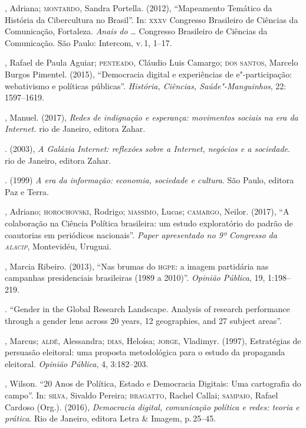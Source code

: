 {\begin{bibliohedra}
, Adriana; \textsc{montardo}, Sandra Portella. (2012), ``Mapeamento
Temático da História da Cibercultura no Brasil''. In: \textsc{xxxv} Congresso
Brasileiro de Ciências da Comunicação, Fortaleza. \textit{Anais do} \ldots{}
Congresso Brasileiro de Ciências da Comunicação. São Paulo: Intercom, v.\,1, 1--17.

, Rafael de Paula Aguiar; \textsc{penteado}, Cláudio Luis Camargo; \textsc{dos
santos}, Marcelo Burgos Pimentel. (2015), ``Democracia digital e
experiências de e"-participação: webativismo e políticas públicas''.
\textit{História, Ciências, Saúde"-Manguinhos}, 22: 1597--1619.

, Manuel. (2017), \textit{Redes de indignação e esperança:
movimentos sociais na era da Internet.} rio de Janeiro, editora Zahar.

\titidem. (2003), \textit{A Galáxia Internet: reflexões sobre a
Internet, negócios e a sociedade}. rio de Janeiro, editora Zahar.

\titidem. (1999) \textit{A era da informação: economia, sociedade
e cultura}. São Paulo, editora Paz e Terra.

, Adriano; \textsc{horochovski}, Rodrigo; \textsc{massimo}, Lucas; \textsc{camargo}, Neilor.
(2017), ``A colaboração na Ciência Política brasileira: um estudo
exploratório do padrão de coautorias em periódicos nacionais''.
\textit{Paper apresentado no 9º Congresso da \textsc{alacip}}, Montevidéu,
Uruguai.

, Marcia Ribeiro. (2013), ``Nas brumas do \textsc{hgpe}: a imagem partidária
nas campanhas presidenciais brasileiras (1989 a 2010)''. \textit{Opinião
Pública}, 19, 1:198--219.

. ``Gender in the Global Research Landscape. Analysis of
research performance through a gender lens across 20 years, 12
geographies, and 27 subject areas''. 

, Marcus; \textsc{aldé}, Alessandra; \textsc{dias}, Heloísa; \textsc{jorge}, Vladimyr.
(1997), Estratégias de persuasão eleitoral: uma proposta metodológica
para o estudo da propaganda eleitoral. \textit{Opinião Pública}, 4,
3:182--203.

, Wilson. ``20 Anos de Política, Estado e Democracia Digitais: Uma
cartografia do campo''. In: \textsc{silva}, Sivaldo Pereira; \textsc{bragatto}, Rachel
Callai; \textsc{sampaio}, Rafael Cardoso (Org.). (2016), \textit{Democracia
digital, comunicação política e redes: teoria e prática}. Rio
de Janeiro, editora Letra \& Imagem, p.\,25--45.


\end{bibliohedra}}
